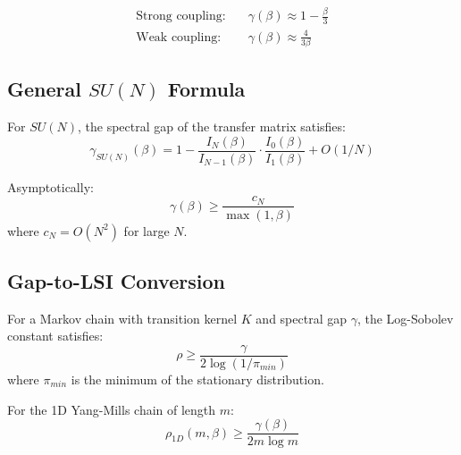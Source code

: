 \begin{corollary}
\label{cor:su3-gap}
\begin{align}
\text{Strong coupling}: \quad & \gamma(\beta) \approx 1 - \frac{\beta}{3} \\
\text{Weak coupling}: \quad & \gamma(\beta) \approx \frac{4}{3\beta}
\end{align}
\end{corollary}

\subsection{General \texorpdfstring{$SU(N)$}{SU(N)} Formula}

\begin{theorem}
\label{thm:sun-gap}
For $SU(N)$, the spectral gap of the transfer matrix satisfies:
\begin{equation}
\gamma_{SU(N)}(\beta) = 1 - \frac{I_N(\beta)}{I_{N-1}(\beta)} \cdot \frac{I_0(\beta)}{I_1(\beta)} + O(1/N)
\end{equation}

Asymptotically:
\begin{equation}
\gamma(\beta) \geq \frac{c_N}{\max(1, \beta)}
\end{equation}
where $c_N = O(N^2)$ for large $N$.
\end{theorem}

\subsection{Gap-to-LSI Conversion}

\begin{theorem}
\label{thm:dsc}
For a Markov chain with transition kernel $K$ and spectral gap $\gamma$, 
the Log-Sobolev constant satisfies:
\begin{equation}
\rho \geq \frac{\gamma}{2 \log(1/\pi_{min})}
\end{equation}
where $\pi_{min}$ is the minimum of the stationary distribution.

For the 1D Yang-Mills chain of length $m$:
\begin{equation}
\rho_{1D}(m, \beta) \geq \frac{\gamma(\beta)}{2m \log m}
\end{equation}
\end{theorem}

